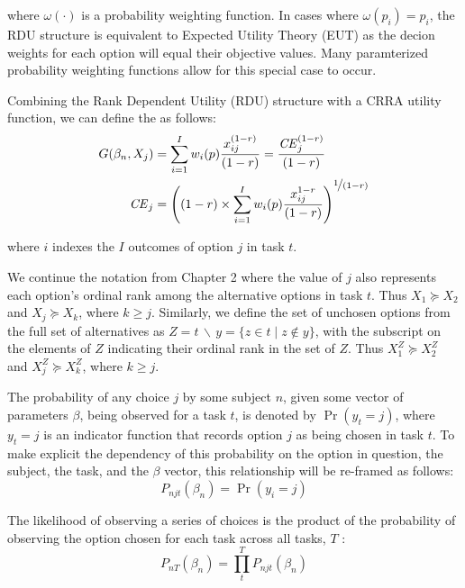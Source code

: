 \documentclass[../main.tex]{subfiles}
\begin{document}
\noindent where $\omega(\cdot)$ is a probability weighting function.
In cases where $\omega(p_i) = p_i$, the RDU structure is equivalent to Expected Utility Theory (EUT) as the decion weights for each option will equal their objective values.
Many paramterized probability weighting functions allow for this special case to occur.

Combining the Rank Dependent Utility (RDU) structure with a CRRA utility function, we can define the {\CE} as follows:
\begin{align}
	\label{eq3:CEcalc}
	\begin{split}
		G(\beta_n,X_j) &= \sum_{i=1}^{I} w_i(p) \frac{x_{ij}^{(1-r)}}{(1-r)} = \frac{ {\mathit{CE}}_j^{(1-r)}}{(1-r)}\\
		{\mathit{CE}}_j &=  \left( (1-r) \times \sum_{i=1}^{I} w_i(p) \frac{x_{ij}^{1-r}}{(1-r)} \right)^{ \displaystyle\nicefrac{1}{(1-r)} }
	\end{split}
\end{align}

\noindent where $i$ indexes the $I$ outcomes of option $j$ in task $t$. 


We continue the notation from Chapter 2 where the value of $j$ also represents each option's ordinal rank among the alternative options in task $t$.
Thus $X_1 \succcurlyeq X_2$ and $X_j \succcurlyeq X_k$, where $k \geq j$.
Similarly, we define the set of unchosen options from the full set of alternatives as $Z = t \,\backslash\, y = \{z \in t \;|\; z \notin y \}$, with the subscript on the elements of $Z$ indicating their ordinal rank in the set of $Z$.
Thus $X_1^Z \succcurlyeq X_2^Z$ and $X_j^Z \succcurlyeq X_k^Z$, where $k \geq j$.

The probability of any choice $j$ by some subject $n$, given some vector of parameters $\beta$, being observed for a task $t$, is denoted by $\Pr( y_t = j)$, where $y_t = j$ is an indicator function that records option $j$ as being chosen in task $t$.
To make explicit the dependency of this probability on the option in question, the subject, the task, and the $\beta$ vector, this relationship will be re-framed as follows:
\begin{equation}
	\label{eq3:Pnjt}
	P_{njt}(\beta_n) = \Pr(y_i = j)
\end{equation}

The likelihood of observing a series of choices is the product of the probability of observing the option chosen for each task across all tasks, $T$ :
\begin{equation}
	\label{eq3:PnT}
	P_{nT}(\beta_n) =  \prod_{t}^{T} P_{njt}(\beta_n)
\end{equation}
\end{document}
